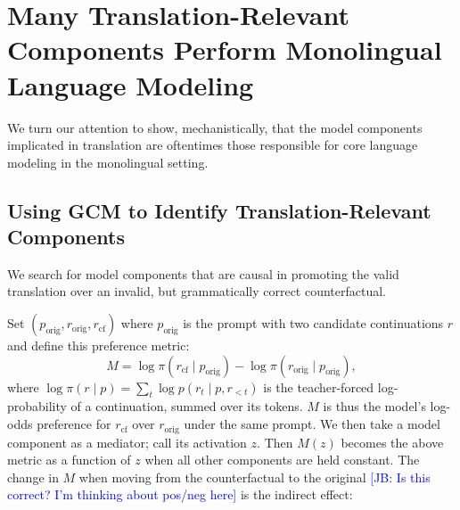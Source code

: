 \documentclass[11pt]{article}
\newcommand{\jb}[1]{\textcolor{blue}{[JB: #1]}}
\begin{document}






\section{Many Translation-Relevant Components Perform Monolingual Language Modeling}

We turn our attention to show, mechanistically, that the model components implicated in translation are oftentimes those responsible for core language modeling in the monolingual setting.

\subsection{Using GCM to Identify Translation-Relevant Components}

We search for model components that are causal in promoting the valid translation over an invalid, but grammatically correct counterfactual.

Set $(p_{\text{orig}}, r_{\text{orig}}, r_{\text{cf}})$ where $p_{\text{orig}}$ is the prompt with two candidate continuations $r$ and define this preference metric:
\begin{equation}
M = \log \pi(r_{\text{cf}}\mid p_{\text{orig}}) - \log \pi(r_{\text{orig}}\mid p_{\text{orig}}),
\label{eq:metric}
\end{equation}
where $\log\pi(r\mid p) = \sum_t \log p(r_t \mid p, r_{<t})$ is the
teacher-forced log-probability of a continuation, summed over its tokens. $M$ is thus the model's log-odds preference for $r_{\text{cf}}$ over $r_{\text{orig}}$ under the same prompt. We then take a model component as a mediator; call its activation $z$. Then $M(z)$ becomes the above metric as a function of $z$ when all other components are held constant. The change in $M$ when moving from the counterfactual to the original \jb{Is this correct? I'm thinking about pos/neg here} is the indirect effect:
\end{document}
